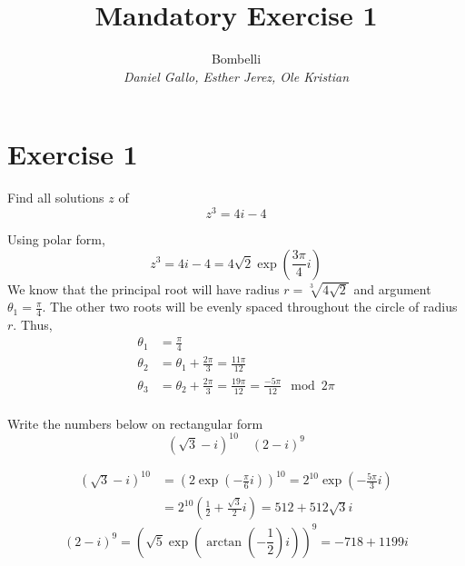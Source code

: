 \documentclass{report}
\title{Mandatory Exercise 1}
\author{
    Bombelli \\
    \textit{Daniel Gallo, Esther Jerez, Ole Kristian}
}
\renewcommand{\exp}[1]{\operatorname{exp}\left(#1\right)}
\renewcommand{\arctan}[1]{\operatorname{arctan} \left(#1\right)}
\begin{document}
    \maketitle
    
    \section*{Exercise 1}
    \begin{tcolorbox}[title=Part a]
        Find all solutions $z$ of
        \begin{equation*}
            z^3 = 4i - 4
        \end{equation*}
    \end{tcolorbox}
    \noindent
    Using polar form,
    \begin{equation*}
        z^3 = 4i - 4 = 4\sqrt{2}\exp{\frac{3\pi}{4}i}
    \end{equation*}
    We know that the principal root will have radius $r = \sqrt[3]{4\sqrt{2}}$ and argument $\theta_1 = \frac{\pi}{4}$. The other two roots will be evenly spaced throughout the circle of radius $r$. Thus,
    \begin{align*}
        \theta_1 &= \frac{\pi}{4} \\
        \theta_2 &= \theta_1 + \frac{2\pi}{3} = \frac{11\pi}{12} \\
        \theta_3 &= \theta_2 + \frac{2\pi}{3} = \frac{19\pi}{12} = \frac{-5\pi}{12} \mod{2\pi}\\
    \end{align*}
    \begin{tcolorbox}[title=Part b]
        Write the numbers below on rectangular form
        \begin{equation*}
            (\sqrt{3} - i)^{10} \quad (2 - i)^{9}
        \end{equation*}
    \end{tcolorbox}
    \begin{align*}
        (\sqrt{3} - i)^{10} &= \left(2\exp{-\frac{\pi}{6}i}\right)^{10} = 2^{10}\exp{-\frac{5\pi}{3}i} \\
        &= 2^{10}\left(\frac{1}{2} + \frac{\sqrt{3}}{2}i\right) = 512 + 512\sqrt{3}i
    \end{align*}
    \begin{equation*}
        (2 - i)^{9} = \left(\sqrt{5}\exp{\arctan{-\frac{1}{2}}i}\right)^{9} = -718 + 1199i
    \end{equation*}
\end{document}
